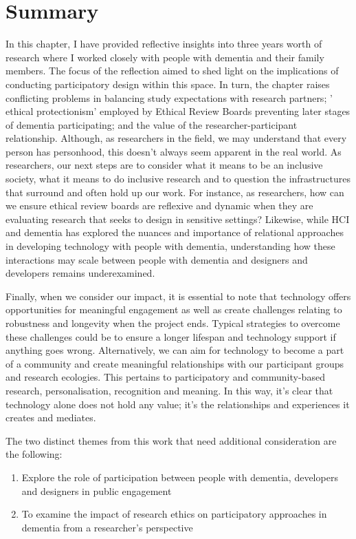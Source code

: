 \section{Summary}
\label{Relationships:Summary}
In this chapter, I have provided reflective insights into three years worth of research where I worked closely with people with dementia and their family members. The focus of the reflection aimed to shed light on the implications of conducting participatory design within this space. In turn, the chapter raises conflicting problems in balancing study expectations with research partners; ' ethical protectionism' employed by Ethical Review Boards preventing later stages of dementia participating; and the value of the researcher-participant relationship. Although, as researchers in the field, we may understand that every person has personhood, this doesn't always seem apparent in the real world. As researchers, our next steps are to consider what it means to be an inclusive society, what it means to do inclusive research and to question the infrastructures that surround and often hold up our work. For instance, as researchers, how can we ensure ethical review boards are reflexive and dynamic when they are evaluating research that seeks to design in sensitive settings? Likewise, while HCI and dementia has explored the nuances and importance of relational approaches in developing technology with people with dementia, understanding how these interactions may scale between people with dementia and designers and developers remains underexamined.

Finally, when we consider our impact, it is essential to note that technology offers opportunities for meaningful engagement as well as create challenges relating to robustness and longevity when the project ends. Typical strategies to overcome these challenges could be to ensure a longer lifespan and technology support if anything goes wrong. Alternatively, we can aim for technology to become a part of a community and create meaningful relationships with our participant groups and research ecologies. This pertains to participatory and community-based research, personalisation, recognition and meaning. In this way, it's clear that technology alone does not hold any value; it's the relationships and experiences it creates and mediates.

The two distinct themes from this work that need additional consideration are the following:
\begin{enumerate}

    \item Explore the role of participation between people with dementia, developers and designers in public engagement 
    \item To examine the impact of research ethics on participatory approaches in dementia from a researcher's perspective
\end{enumerate}

